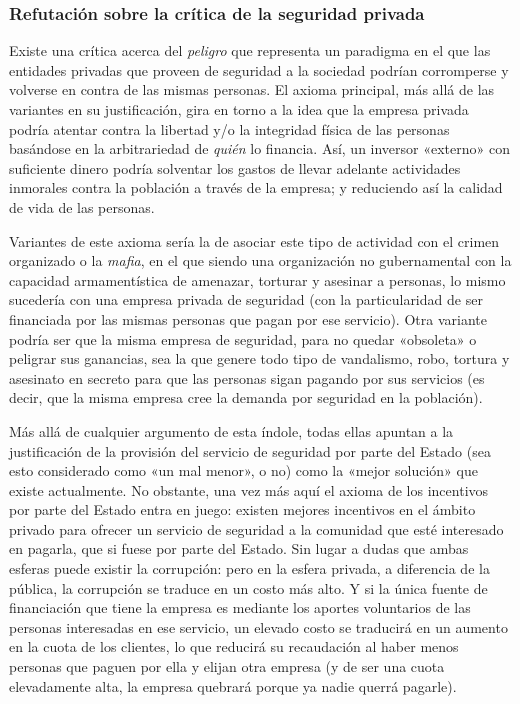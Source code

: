 \documentclass[12pt,a4paper,twoside]{book}
\begin{document}
\subsubsection{Refutación sobre la crítica de la seguridad privada}
Existe una crítica acerca del \textit{peligro} que representa un paradigma en el que las entidades privadas que proveen de seguridad a la sociedad podrían corromperse y volverse en contra de las mismas personas. El axioma principal, más allá de las variantes en su justificación, gira en torno a la idea que la empresa privada podría atentar contra la libertad y/o la integridad física de las personas basándose en la arbitrariedad de \textit{quién} lo financia. Así, un inversor «externo» con suficiente dinero podría solventar los gastos de llevar adelante actividades inmorales contra la población a través de  la empresa; y reduciendo así la calidad de vida de las personas.

Variantes de este axioma sería la de asociar este tipo de actividad con el crimen organizado o la \textit{mafia}, en el que siendo una organización no gubernamental con la capacidad armamentística de amenazar, torturar y asesinar a personas, lo mismo sucedería con una empresa privada de seguridad (con la particularidad de ser financiada por las mismas personas que pagan por ese servicio). Otra variante podría ser que la misma empresa de seguridad, para no quedar «obsoleta» o peligrar sus ganancias, sea la que genere  todo tipo de vandalismo, robo, tortura y asesinato en secreto para que las personas sigan pagando por sus servicios (es decir, que la misma empresa cree la demanda por seguridad en la población).

Más allá de cualquier argumento de esta índole, todas ellas apuntan a la justificación de la provisión del servicio de seguridad por parte del Estado (sea esto considerado como «un mal menor», o no) como la «mejor solución» que existe actualmente. No obstante, una vez más aquí el axioma de los incentivos por parte del Estado entra en juego: existen mejores incentivos en el ámbito privado para ofrecer un servicio de seguridad a la comunidad que esté interesado en pagarla, que si fuese por parte del Estado. Sin lugar a dudas que ambas esferas puede existir la corrupción: pero en la esfera privada, a diferencia de la pública, la corrupción se traduce en un costo más alto. Y si la única fuente de financiación que tiene la empresa es mediante los aportes voluntarios de las personas interesadas en ese servicio, un elevado costo se traducirá en un aumento en la cuota de los clientes, lo que reducirá su recaudación al haber menos personas que paguen por ella y elijan otra empresa (y de ser una cuota elevadamente alta, la empresa quebrará porque ya nadie querrá pagarle).
\end{document}
